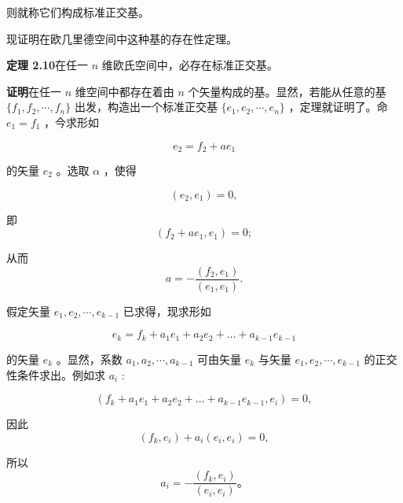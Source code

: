 则就称它们构成标准正交基。

现证明在欧几里德空间中这种基的存在性定理。

\textbf{定理 2.10}\quad 在任一 $n$ 维欧氏空间中，必存在标准正交基。

\textbf{证明}\quad 在任一 $n$ 维空间中都存在着由 $n$ 个矢量构成的基。显然，若能从任意的基 $\{f_{1}, f_{2}, \cdots, f_{n}\}$ 出发，构造出一个标准正交基 $\{e_{1}, e_{2}, \cdots, e_{n}\}$ ，定理就证明了。命 $e_{1} = f_{1}$ ，今求形如

\begin{equation*}
e _ {2} = f _ {2} + a e _ {1}
\end{equation*}

的矢量 $e_2$ 。选取 $\alpha$ ，使得

\begin{equation*}
(e _ {2}, e _ {1}) = 0,
\end{equation*}

即
\begin{equation*}
\left(f _ {2} + a e _ {1}, e _ {1}\right) = 0;
\end{equation*}

从而
\begin{equation*}
a = - \frac {\left(f _ {2} , e _ {1}\right)}{\left(e _ {1} , e _ {1}\right)}.
\end{equation*}

假定矢量 $e_{1}, e_{2}, \cdots, e_{k-1}$ 已求得，现求形如

\begin{equation*}
e _ {k} = f _ {k} + a _ {1} e _ {1} + a _ {2} e _ {2} + \dots + a _ {k - 1} e _ {k - 1}\tag{2.70}
\end{equation*}

的矢量 $e_{k}$ 。显然，系数 $a_{1}, a_{2}, \cdots, a_{k-1}$ 可由矢量 $e_{k}$ 与矢量 $e_{1}, e_{2}, \cdots, e_{k-1}$ 的正交性条件求出。例如求 $a_{i}$ :

\begin{equation*}
\left(f _ {k} + a _ {1} e _ {1} + a _ {2} e _ {2} + \dots + a _ {k - 1} e _ {k - 1}, e _ {i}\right) = 0,
\end{equation*}

因此
\begin{equation*}
\left(f _ {k}, e _ {i}\right) + a _ {i} \left(e _ {i}, e _ {i}\right) = 0,
\end{equation*}

所以
\begin{equation*}
a _ {i} = - \frac {\left(f _ {k} , e _ {i}\right)}{\left(e _ {i} , e _ {i}\right)} \text{。}
\end{equation*}

